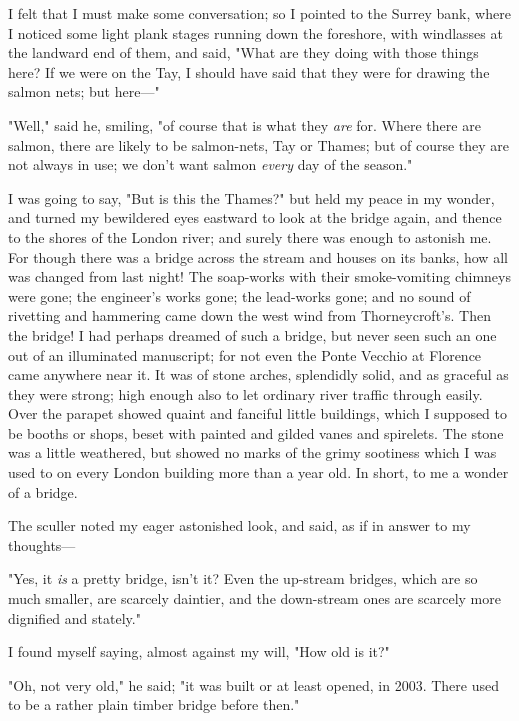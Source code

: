 I felt that I must make some conversation; so I pointed to the Surrey
bank, where I noticed some light plank stages running down the
foreshore, with windlasses at the landward end of them, and said, "What
are they doing with those things here? If we were on the Tay, I should
have said that they were for drawing the salmon nets; but here---"

"Well," said he, smiling, "of course that is what they \emph{are} for.
Where there are salmon, there are likely to be salmon-nets, Tay or
Thames; but of course they are not always in use; we don't want salmon
\emph{every} day of the season."

I was going to say, "But is this the Thames?" but held my peace in my
wonder, and turned my bewildered eyes eastward to look at the bridge
again, and thence to the shores of the London river; and surely there
was enough to astonish me. For though there was a bridge across the
stream and houses on its banks, how all was changed from last night! The
soap-works with their smoke-vomiting chimneys were gone; the engineer's
works gone; the lead-works gone; and no sound of rivetting and hammering
came down the west wind from Thorneycroft's. Then the bridge! I had
perhaps dreamed of such a bridge, but never seen such an one out of an
illuminated manuscript; for not even the Ponte Vecchio at Florence came
anywhere near it. It was of stone arches, splendidly solid, and as
graceful as they were strong; high enough also to let ordinary river
traffic through easily. Over the parapet showed quaint and fanciful
little buildings, which I supposed to be booths or shops, beset with
painted and gilded vanes and spirelets. The stone was a little
weathered, but showed no marks of the grimy sootiness which I was used
to on every London building more than a year old. In short, to me a
wonder of a bridge.

The sculler noted my eager astonished look, and said, as if in answer to
my thoughts---

"Yes, it \emph{is} a pretty bridge, isn't it? Even the up-stream
bridges, which are so much smaller, are scarcely daintier, and the
down-stream ones are scarcely more dignified and stately."

I found myself saying, almost against my will, "How old is it?"

"Oh, not very old," he said; "it was built or at least opened, in 2003.
There used to be a rather plain timber bridge before then."

